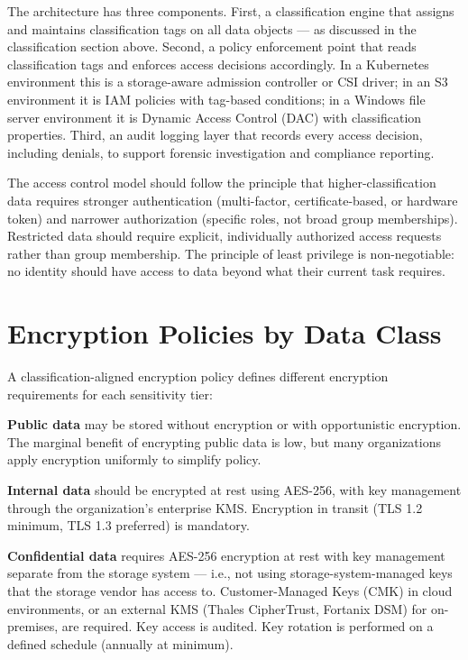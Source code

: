 The architecture has three components. First, a classification engine that assigns and maintains classification tags on all data objects --- as discussed in the classification section above. Second, a policy enforcement point that reads classification tags and enforces access decisions accordingly. In a Kubernetes environment this is a storage-aware admission controller or CSI driver; in an S3 environment it is IAM policies with tag-based conditions; in a Windows file server environment it is Dynamic Access Control (DAC) with classification properties. Third, an audit logging layer that records every access decision, including denials, to support forensic investigation and compliance reporting.

The access control model should follow the principle that higher-classification data requires stronger authentication (multi-factor, certificate-based, or hardware token) and narrower authorization (specific roles, not broad group memberships). Restricted data should require explicit, individually authorized access requests rather than group membership. The principle of least privilege is non-negotiable: no identity should have access to data beyond what their current task requires.

\section{Encryption Policies by Data Class}
A classification-aligned encryption policy defines different encryption requirements for each sensitivity tier:

\textbf{Public data} may be stored without encryption or with opportunistic encryption. The marginal benefit of encrypting public data is low, but many organizations apply encryption uniformly to simplify policy.

\textbf{Internal data} should be encrypted at rest using AES-256, with key management through the organization's enterprise KMS. Encryption in transit (TLS 1.2 minimum, TLS 1.3 preferred) is mandatory.

\textbf{Confidential data} requires AES-256 encryption at rest with key management separate from the storage system --- i.e., not using storage-system-managed keys that the storage vendor has access to. Customer-Managed Keys (CMK) in cloud environments, or an external KMS (Thales CipherTrust, Fortanix DSM) for on-premises, are required. Key access is audited. Key rotation is performed on a defined schedule (annually at minimum).

